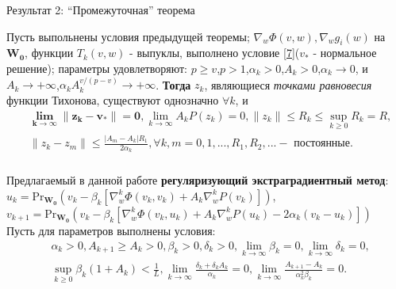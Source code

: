 \documentclass[unicode, t, 11pt]{beamer}%
\begin{document}
\begin{frame}
\frametitle{\insertsection}
\framesubtitle{\insertsubsection}
\begin{block}{Результат 2: ``Промежуточная'' теорема}
	\begin{small}
		Пусть выпольнены условия предыдущей теоремы; $\nabla_w\Phi(v,w),\nabla_wg_i(w)$ на $\mathbf{W_0}$, функции $T_k(v,w)$ - выпуклы, выполнено условие \eqref{7}($v_*$ - нормальное решение); параметры удовлетворяют: $p\geqslant v$,$p>1$,$\alpha_k>0$,$A_k>0$,$\alpha_k\to 0$, и $A_k\to +\infty$,$\alpha_kA^{v/(p-v)}_k\to +\infty$. \textbf{Тогда} $z_k$, являющиеся \textit{точками равновесия} функции Тихонова, существуют однозначно $\forall k$, и
	\begin{equation*}
	\begin{aligned}
	&\bm{\lim\limits_{k\to \infty}\|z_k-v_*\|=0},\lim\limits_{k\to \infty}A_kP(z_k)=0,\|z_k\|\leqslant R_k\leqslant\sup\limits_{k\geqslant 0}R_k=R,\\
	& \|z_k-z_m\|\leqslant \frac{|A_m-A_k|R_1}{2\alpha_k},\forall k,m=0,1,..., R_1,R_2,... - \text{ постоянные.}
	\end{aligned}
	\end{equation*}  
	\end{small}
\end{block}
\end{frame}

\begin{frame}
\frametitle{\insertsection}
\framesubtitle{\insertsubsection}
Предлагаемый в данной работе \textbf{регуляризующий экстраградиентный метод}:\\[5mm]

	$u_k=\mathrm{Pr}_{\mathbf{W_0}}(v_k-\beta_k[\nabla_w^k\Phi(v_k,v_k)+A_k\nabla_w^kP(v_k)])$,\\
	$v_{k+1}=\mathrm{Pr}_{\mathbf{W_0}}(v_k-\beta_k[\nabla_w^k\Phi(v_k,u_k)+A_k\nabla_w^kP(u_k)-2\alpha_k(v_k-u_k)])$\\[10mm]

Пусть для параметров выполнены условия:
\begin{equation}
\label{[3]-30}
\begin{aligned}
&\alpha_k >0,A_{k+1}\geqslant A_k>0,\beta_k>0,\delta_k>0,\lim_{k\to \infty}\beta_k=0,\lim_{k\to\infty}\delta_k=0,\\
&\sup_{k\geqslant 0}\beta_k(1+A_k)<\frac{1}{L},\lim_{k\to\infty}\frac{\delta_k+\delta_kA_k}{\alpha_k}=0,\lim_{k\to \infty}\frac{A_{k+1}-A_k}{\alpha_k^2\beta_k}=0.
\end{aligned}
\end{equation}
\end{frame}
\end{document}
